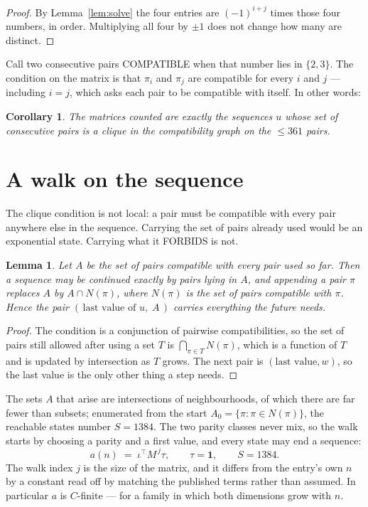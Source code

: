 \documentclass[11pt,a4paper]{article}
\theoremstyle{plain}
\newtheorem{lemma}[theorem]{Lemma}
\newtheorem{corollary}[theorem]{Corollary}
\theoremstyle{definition}
\begin{document}
\begin{proof}
By Lemma~\ref{lem:solve} the four entries are $(-1)^{i+j}$ times those four numbers, in
order. Multiplying all four by $\pm1$ does not change how many are distinct.
\end{proof}

Call two consecutive pairs COMPATIBLE when that number lies in $\{2,3\}$. The condition on the
matrix is that $\pi_i$ and $\pi_j$ are compatible for every $i$ and $j$ --- including $i=j$,
which asks each pair to be compatible with itself. In other words:

\begin{corollary}
The matrices counted are exactly the sequences $u$ whose set of consecutive pairs is a clique in
the compatibility graph on the $\le 361$ pairs.
\end{corollary}

\section{A walk on the sequence}

The clique condition is not local: a pair must be compatible with every pair anywhere else in
the sequence. Carrying the set of pairs already used would be an exponential state. Carrying
what it FORBIDS is not.

\begin{lemma}\label{lem:lump}
Let $A$ be the set of pairs compatible with every pair used so far. Then a sequence may be
continued exactly by pairs lying in $A$, and appending a pair $\pi$ replaces $A$ by
$A\cap N(\pi)$, where $N(\pi)$ is the set of pairs compatible with $\pi$. Hence the pair
$(\,\text{last value of }u,\;A\,)$ carries everything the future needs.
\end{lemma}

\begin{proof}
The condition is a conjunction of pairwise compatibilities, so the set of pairs still allowed
after using a set $T$ is $\bigcap_{\pi\in T}N(\pi)$, which is a function of $T$ and is updated
by intersection as $T$ grows. The next pair is $(\text{last value},w)$, so the last value is
the only other thing a step needs.
\end{proof}

The sets $A$ that arise are intersections of neighbourhoods, of which there are far fewer than
subsets; enumerated from the start $A_0=\{\pi:\pi\in N(\pi)\}$, the reachable states number
$S=1384$. The two parity classes never mix, so the walk starts by choosing a parity and a first
value, and every state may end a sequence:
\[
a(n)\;=\;\iota^{\!\top}M^{\,j}\tau ,\qquad \tau=\mathbf{1},\qquad S=1384.
\]
The walk index $j$ is the size of the matrix, and it differs from the entry's own $n$ by a
constant read off by matching the published terms rather than assumed. In particular $a$ is
$C$-finite --- for a family in which both dimensions grow with $n$.
\end{document}
